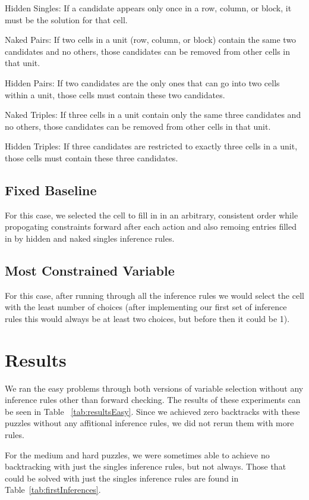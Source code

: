 \documentclass{article}
\begin{document}
{Hidden Singles: If a candidate appears only once in a row, column, or block, it must be the solution for that cell.}

{Naked Pairs: If two cells in a unit (row, column, or block) contain the same two candidates and no others, those candidates can be removed from other cells in that unit.}

{Hidden Pairs: If two candidates are the only ones that can go into two cells within a unit, those cells must contain these two candidates.}

{Naked Triples: If three cells in a unit contain only the same three candidates and no others, those candidates can be removed from other cells in that unit.}

{Hidden Triples: If three candidates are restricted to exactly three cells in a unit, those cells must contain these three candidates.}


\subsection{Fixed  Baseline}
For this case, we selected the  cell to fill in in an arbitrary, consistent order while propogating constraints forward after each action and also remoing entries filled in by hidden and naked singles inference rules. 
\subsection{Most Constrained Variable}
For this case, after running through all the inference rules we would select the cell with the least number of choices (after implementing our first set of inference rules this would always be at least two choices, but before then it could be 1). 

\section{Results}
We ran the easy problems through both versions of variable selection without any inference rules other than forward checking. The results of these experiments can be seen in Table ~\ref{tab:resultsEasy}. Since we achieved zero backtracks with these puzzles without any affitional inference rules, we did not rerun them with more rules.

For the medium and hard puzzles, we were sometimes able to achieve no backtracking with just the singles inference rules, but not always. Those that could be solved with just the singles inference rules are found in Table~\ref{tab:firstInferences}.
\end{document}
